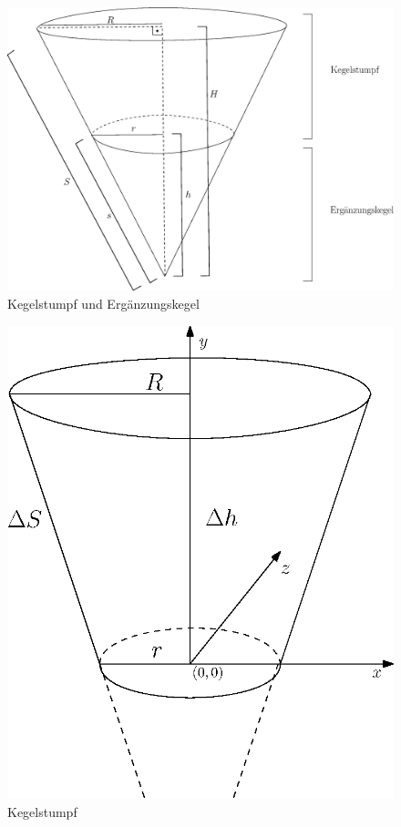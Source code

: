 \begin{figure}[!htb]
	\centering
	\includegraphics[scale=.4]{images/fullCone3.eps}
	\caption{Kegelstumpf und Ergänzungskegel}
	\label{fig:coneWithFrustum}
\end{figure}

\begin{figure}[!htb]
	\centering
	\includegraphics[scale=.7]{images/coneFrustum.eps}
	\caption{Kegelstumpf}
	\label{fig:coneFrustum}
\end{figure}

